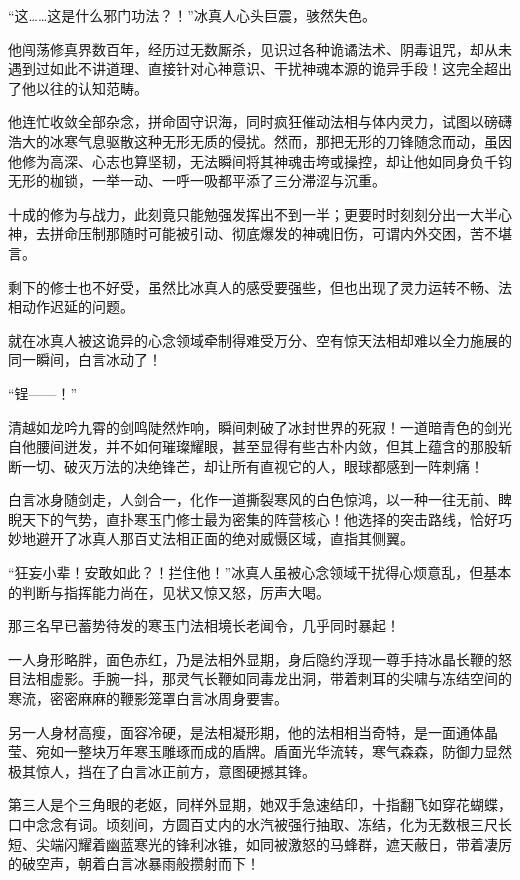 “这……这是什么邪门功法？！”冰真人心头巨震，骇然失色。

他闯荡修真界数百年，经历过无数厮杀，见识过各种诡谲法术、阴毒诅咒，却从未遇到过如此不讲道理、直接针对心神意识、干扰神魂本源的诡异手段！这完全超出了他以往的认知范畴。

他连忙收敛全部杂念，拼命固守识海，同时疯狂催动法相与体内灵力，试图以磅礴浩大的冰寒气息驱散这种无形无质的侵扰。然而，那把无形的刀锋随念而动，虽因他修为高深、心志也算坚韧，无法瞬间将其神魂击垮或操控，却让他如同身负千钧无形的枷锁，一举一动、一呼一吸都平添了三分滞涩与沉重。

十成的修为与战力，此刻竟只能勉强发挥出不到一半；更要时时刻刻分出一大半心神，去拼命压制那随时可能被引动、彻底爆发的神魂旧伤，可谓内外交困，苦不堪言。

剩下的修士也不好受，虽然比冰真人的感受要强些，但也出现了灵力运转不畅、法相动作迟延的问题。

就在冰真人被这诡异的心念领域牵制得难受万分、空有惊天法相却难以全力施展的同一瞬间，白言冰动了！

“锃——！”

清越如龙吟九霄的剑鸣陡然炸响，瞬间刺破了冰封世界的死寂！一道暗青色的剑光自他腰间迸发，并不如何璀璨耀眼，甚至显得有些古朴内敛，但其上蕴含的那股斩断一切、破灭万法的决绝锋芒，却让所有直视它的人，眼球都感到一阵刺痛！

白言冰身随剑走，人剑合一，化作一道撕裂寒风的白色惊鸿，以一种一往无前、睥睨天下的气势，直扑寒玉门修士最为密集的阵营核心！他选择的突击路线，恰好巧妙地避开了冰真人那百丈法相正面的绝对威慑区域，直指其侧翼。

“狂妄小辈！安敢如此？！拦住他！”冰真人虽被心念领域干扰得心烦意乱，但基本的判断与指挥能力尚在，见状又惊又怒，厉声大喝。

那三名早已蓄势待发的寒玉门法相境长老闻令，几乎同时暴起！

一人身形略胖，面色赤红，乃是法相外显期，身后隐约浮现一尊手持冰晶长鞭的怒目法相虚影。手腕一抖，那灵气长鞭如同毒龙出洞，带着刺耳的尖啸与冻结空间的寒流，密密麻麻的鞭影笼罩白言冰周身要害。

另一人身材高瘦，面容冷硬，是法相凝形期，他的法相相当奇特，是一面通体晶莹、宛如一整块万年寒玉雕琢而成的盾牌。盾面光华流转，寒气森森，防御力显然极其惊人，挡在了白言冰正前方，意图硬撼其锋。

第三人是个三角眼的老妪，同样外显期，她双手急速结印，十指翻飞如穿花蝴蝶，口中念念有词。顷刻间，方圆百丈内的水汽被强行抽取、冻结，化为无数根三尺长短、尖端闪耀着幽蓝寒光的锋利冰锥，如同被激怒的马蜂群，遮天蔽日，带着凄厉的破空声，朝着白言冰暴雨般攒射而下！

